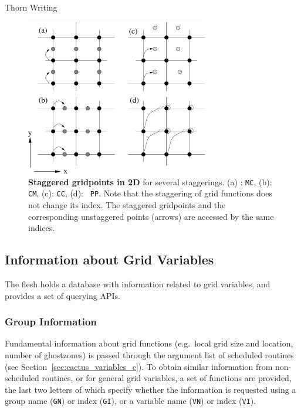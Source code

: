 \begin{cactuspart}{Thorn Writing}
\begin{figure}[ht]
  \def\epsfsize#1#2{0.45#1}
\begin{center}
\includegraphics[angle=0,width=8cm]{staggering1}
\end{center}
\caption[]{\small {\bf Staggered gridpoints in 2D} for several
staggerings. (a) : \texttt{MC}, (b): \texttt{CM}, (c): \texttt{CC}, (d): {\tt
PP}. Note that the staggering of grid functions does not change its
index. The staggered gridpoints and the corresponding unstaggered
points (arrows) are accessed by the same indices.}
\label{fig:stagger1}
\end{figure}

\subsection{Information about Grid Variables}

The flesh holds a database with information related to grid variables, and
provides a set of querying APIs.

\subsubsection{Group Information}

Fundamental information about grid functions (e.g.\ local grid size and
location, number of ghostzones) is passed through the argument list of
scheduled routines (see Section~\ref{sec:cactus_variables_c}). To obtain similar information
from non-scheduled routines, or for general grid variables, a set of
functions are provided, the last two letters of which specify whether
the information is requested using a group name (\texttt{GN}) or index
(\texttt{GI}), or a variable name (\texttt{VN}) or index (\texttt{VI}).

\begin{Lentry}


\end{Lentry}
\end{cactuspart}
